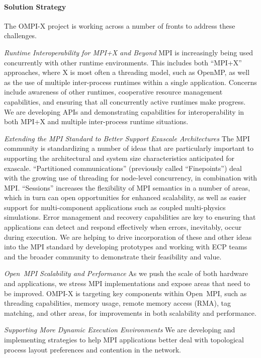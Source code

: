 \paragraph{Solution Strategy}
The OMPI-X project is working across a number of fronts to address
these challenges.

\emph{Runtime Interoperability for MPI+X and Beyond} MPI is
increasingly being used concurrently with other runtime environments.
This includes both ``MPI+X'' approaches, where X
is most often a threading model, such as OpenMP, as
well as the use of multiple inter-process runtimes within a single
application.  Concerns include awareness of other runtimes,
cooperative resource management capabilities, and ensuring that all
concurrently active runtimes make progress.  We are developing APIs and
demonstrating capabilities for interoperability in both MPI+X and
multiple inter-process runtime situations.

\emph{Extending the MPI Standard to Better Support Exascale
Architectures} The MPI community is standardizing a
number of ideas that
are particularly important to supporting
the architectural and system size characteristics anticipated for
exascale.  ``Partitioned communications'' (previously called ``Finepoints'')
deal with the growing use of threading for node-level concurrency, in
combination with MPI.  ``Sessions'' increases the flexibility of MPI
semantics in a number of areas, which in turn can open opportunities
for enhanced scalability, as well as easier support for
multi-component applications such as coupled multi-physics
simulations. Error management and recovery capabilities are key to
ensuring that applications can detect and respond effectively when errors,
inevitably, occur during execution.  We are helping to drive incorporation
of these and other ideas into the MPI standard by developing prototypes and
working with ECP teams and the broader community to demonstrate their
feasibility and value.

\emph{Open~MPI Scalability and Performance} As we push the scale of
both hardware and applications, we stress MPI implementations and
expose areas that need to be improved.
OMPI-X is targeting key components within Open~MPI, such as threading capabilities,
memory usage, remote memory access (RMA), tag matching, and other areas,
for improvements in both scalability and performance.

\emph{Supporting More Dynamic Execution Environments} We are
developing and implementing strategies to help MPI applications
better deal with topological process layout preferences
and contention in the network.

